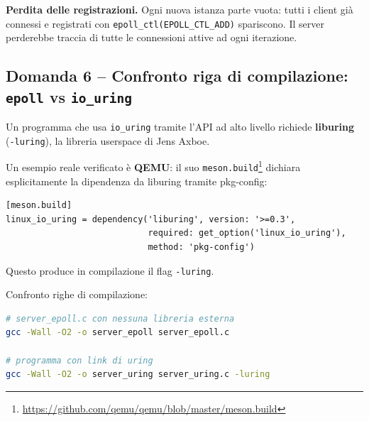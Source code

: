 \documentclass[a4paper,12pt]{article}
\begin{document}
\textbf{Perdita delle registrazioni.} Ogni nuova istanza parte vuota: tutti i client
già connessi e registrati con \texttt{epoll\_ctl(EPOLL\_CTL\_ADD)} spariscono. Il server
perderebbe traccia di tutte le connessioni attive ad ogni iterazione.

\subsection*{Domanda 6 -- Confronto riga di compilazione: \texttt{epoll} vs \texttt{io\_uring}}

Un programma che usa \texttt{io\_uring} tramite l'API ad alto livello richiede
\textbf{liburing} (\texttt{-luring}), la libreria userspace di Jens Axboe.

Un esempio reale verificato è \textbf{QEMU}: il suo \texttt{meson.build}\footnote{\url{https://github.com/qemu/qemu/blob/master/meson.build}} dichiara
esplicitamente la dipendenza da liburing tramite pkg-config:

\begin{verbatim}[meson.build]
linux_io_uring = dependency('liburing', version: '>=0.3',
                            required: get_option('linux_io_uring'),
                            method: 'pkg-config')
\end{verbatim}

Questo produce in compilazione il flag \texttt{-luring}.

\medskip
\noindent Confronto righe di compilazione:

\begin{lstlisting}[language=bash]
# server_epoll.c con nessuna libreria esterna
gcc -Wall -O2 -o server_epoll server_epoll.c

# programma con link di uring
gcc -Wall -O2 -o server_uring server_uring.c -luring
\end{lstlisting}
\end{document}
